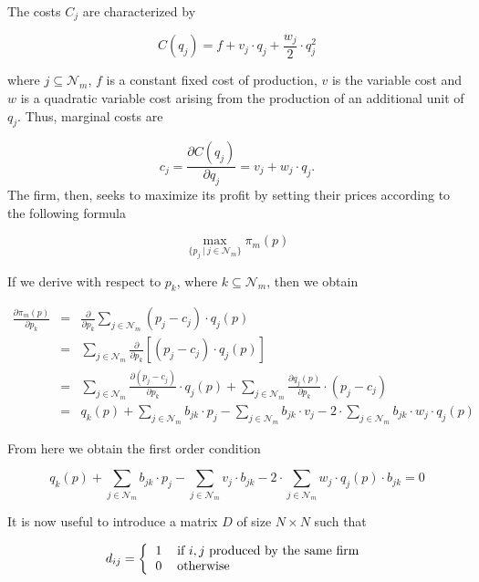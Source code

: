 \documentclass[12pt]{article}
\begin{document}
The costs $C_j$ are characterized by

\begin{equation*}
C(q_j) = f + v_j \cdot q_j + \frac{w_j}{2} \cdot q_j ^ {2}
\end{equation*}

where $j \subseteq \mathcal{N}_m$, $f$ is a constant fixed cost of production, $v$ is the variable cost and $w$ is a quadratic variable cost arising from the production of an additional unit of $q_j$. Thus, marginal costs are

\begin{equation*}
c_j = \frac{\partial C(q_j)}{\partial q_j}= v_j + w_j \cdot q_j.
\end{equation*}
The firm, then, seeks to maximize its profit by setting their prices according to the following formula

\begin{equation*}
\max_{\{p_j ~ | ~ j \in \mathcal{N}_m\}} \pi_m(p)
\end{equation*}

If we derive with respect to $p_k$, where $k \subseteq \mathcal{N}_m$, then we obtain

\begin{eqnarray*}
\frac{\partial\pi_m(p)}{\partial p_k} &=& \frac{\partial}{\partial p_k} \sum_{j \in \mathcal{N}_m} (p_j - c_j) \cdot q_j(p) \\
&=& \sum_{j \in \mathcal{N}_m} \frac{\partial}{\partial p_k} \left[(p_j - c_j) \cdot q_j(p)\right] \\
&=& \sum_{j \in \mathcal{N}_m} \frac{\partial (p_j - c_j)}{\partial p_k} \cdot q_j(p) + \sum_{j \in \mathcal{N}_m} \frac{\partial q_j(p)}{\partial p_k} \cdot (p_j - c_j)\\
&=& q_k(p) + \sum_{j \in \mathcal{N}_m} b_{jk} \cdot p_j - \sum_{j \in \mathcal{N}_m} b_{jk} \cdot v_j - 2 \cdot \sum_{j \in \mathcal{N}_m} b_{jk} \cdot w_j \cdot q_j (p) 
\end{eqnarray*}

From here we obtain the first order condition

\begin{equation*}
q_k(p) + \sum_{j \in \mathcal{N}_m} b_{jk} \cdot p_j - \sum_{j \in \mathcal{N}_m} v_j \cdot b_{jk} - 2 \cdot \sum_{j \in \mathcal{N}_m} w_j \cdot q_j (p) \cdot b_{jk} = 0
\end{equation*}

It is now useful to introduce a matrix $D$ of size $N \times N$ such that

\begin{equation*}
d_{ij} = \left\{
\begin{tabular}{ll}
1 & if $i,j$ produced by the same firm\\
0 & otherwise
\end{tabular}\right.
\end{equation*}
\end{document}
